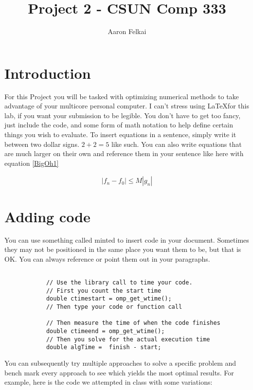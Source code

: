 \documentclass{article}
\begin{document}
\title{Project 2 - CSUN Comp 333}
\author{Aaron Felkai}
\maketitle

\section{Introduction}
For this Project you will be tasked with optimizing numerical methods to take advantage of your multicore personal computer. I can't stress using \LaTeX for this lab, if you want your submission to be legible.  You don't have to get too fancy, just include the code, and some form of math notation to help define certain things you wish to evaluate. To insert equations in a sentence, simply write it between two dollar signs. $ 2 + 2 = 5$ like such. You can also write equations that are much larger on their own and reference them in your sentence like here with equation \ref{BigOh1}

\begin{eqnarray}\label{BigOh1}
   \left | f_{n} - f_{0}   \right | \leq M\left | g_{n} \right |  
\end{eqnarray}

\section{Adding code}


You can use something called minted to insert code in your document. Sometimes they may not be positioned in the same place you want them to be, but that is OK. You can always reference or point them out in your paragraphs. 

\begin{verbatim} 

            // Use the library call to time your code.
            // First you count the start time 
            double ctimestart = omp_get_wtime();
            // Then type your code or function call
            
            // Then measure the time of when the code finishes
            double ctimeend = omp_get_wtime();
            // Then you solve for the actual execution time
            double algTime =  finish - start;

\end{verbatim}

You can subsequently try multiple approaches to solve a specific problem and bench mark every approach to see which yields the most optimal results. For example, here is the code we attempted in class with some variations:
\end{document}
